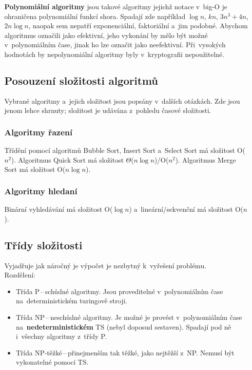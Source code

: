 \textbf{Polynomiální algoritmy} jsou takové algoritmy jejichž notace v~big-O je ohraničena polynomiální funkcí shora. Spadají zde například $\log{n}$, $kn$, $3n^3 + 4n$, $2n\log{n}$, naopak sem nepatří exponenciální, faktoriální a~jim podobné. Abychom algoritmus označili jako efektivní, jeho vykonání by mělo být možné v~polynomiálním čase, jinak ho lze označit jako neefektivní. Při~vysokých hodnotách by nepolynomiální algoritmy byly v~kryptografii nepoužitelné.

\subsection{Posouzení složitosti algoritmů}

Vybrané algoritmy a~jejich složitost jsou popsány v~dalších otázkách. Zde jsou jenom lehce shrnuty; složitost je udávána z~pohledu časové složitosti.

\subsubsection{Algoritmy řazení}

Třídění pomocí algoritmů Bubble Sort, Insert Sort a~Select Sort má složitost O($n^2$). Algoritmus Quick Sort má složitost $\Theta$($n\log{n}$)/O($n^2$). Algoritmus Merge Sort má složitost O($n\log{n}$).

\subsubsection{Algoritmy hledaní}

Binární vyhledávání má složitost O($\log{n}$) a~lineární/sekvenční má složitost O($n$).

\subsection{Třídy složitosti}

Vyjadřuje jak náročný je výpočet je nezbytný k~vyřešení problému. \\
Rozdělení:
\begin{itemize}
	\item Třída P\,--\,schůdné algoritmy. Jsou proveditelné v~polynomiálním čase na~deterministickém turingově stroji.
	\item Třída NP\,--\,neschůdné algoritmy. Je možné je provést v~polynomiálním čase na~\textbf{nedeterministickém} TS (nebyl doposud sestaven). Spadají pod ně i~všechny algoritmy z~třídy P.
	\item Třída NP-těžké\,--\,přinejmenším tak těžké, jako nejtěžší z~NP. Nemusí být vykonatelné pomocí TS.
\end{itemize}

